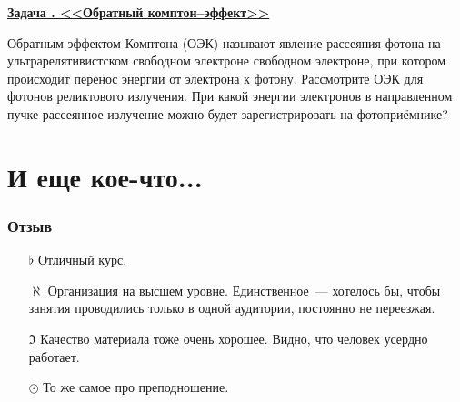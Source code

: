 \documentclass[11pt]{article}
\theoremstyle{definition}\newtheorem{defi}{Определение}
\newcounter{taskn}[section]
\newenvironment{task}[1]{%
\begin{framed}
  \noindent
  \underline{\bfseries Задача \stepcounter{taskn}\thetaskn. <<#1>>}
  \setlength{\parindent}{0cm}
}{%
\end{framed}
}
\begin{document}
\begin{task}{Обратный комптон--эффект}

Обратным эффектом Комптона (ОЭК) называют явление рассеяния фотона на ультрарелятивистском свободном электроне свободном электроне, при котором происходит перенос энергии от электрона к фотону. Рассмотрите ОЭК для фотонов реликтового излучения. При какой энергии электронов в направленном пучке рассеянное излучение можно будет зарегистрировать на фотоприёмнике?

\end{task}


\part{И еще кое-что...}

\section{Отзыв}

\begin{itemize}

\item[$\flat$] Отличный курс.
\item[$\aleph$] Организация на высшем уровне. Единственное~--- хотелось бы, чтобы занятия проводились только в одной аудитории, постоянно не переезжая.
\item[$\Im$] Качество материала тоже очень хорошее. Видно, что человек усердно работает.
\item[$\odot$] То же самое про преподношение.

\end{itemize}
\end{document}
